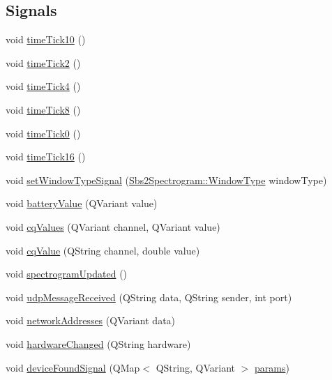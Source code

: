 \subsection*{Signals}
\begin{DoxyCompactItemize}
\item 
void \hyperlink{classSbs2Callback_a5184124613eada5520f1a3a170004a2b}{time\-Tick10} ()
\item 
void \hyperlink{classSbs2Callback_ad2664cc07b84a0bf32853d8b73a33269}{time\-Tick2} ()
\item 
void \hyperlink{classSbs2Callback_afc2ede902add0f774b75fd6180c4d2f6}{time\-Tick4} ()
\item 
void \hyperlink{classSbs2Callback_a97bab20747140c597618f804b6228072}{time\-Tick8} ()
\item 
void \hyperlink{classSbs2Callback_a61ec73d9af8b810f81eda4d953a7d514}{time\-Tick0} ()
\item 
void \hyperlink{classSbs2Callback_aadf4b16079f8dcadbd09b3469682092f}{time\-Tick16} ()
\item 
void \hyperlink{classSbs2Callback_ad3bb5730a00149ba4b72342050aaf0a6}{set\-Window\-Type\-Signal} (\hyperlink{classSbs2Spectrogram_a22265347883488b8385c83b67882d915}{Sbs2\-Spectrogram\-::\-Window\-Type} window\-Type)
\item 
void \hyperlink{classSbs2Callback_ab6e4c13c9062855f656df9ceed5cd043}{battery\-Value} (Q\-Variant value)
\item 
void \hyperlink{classSbs2Callback_a06f6ee83c0568d015737115c1bda0c35}{cq\-Values} (Q\-Variant channel, Q\-Variant value)
\item 
void \hyperlink{classSbs2Callback_a234ed679eb92e8d74a570fe6b212ac01}{cq\-Value} (Q\-String channel, double value)
\item 
void \hyperlink{classSbs2Callback_aad050bf9599c2adce3d7a40e635da9ad}{spectrogram\-Updated} ()
\item 
void \hyperlink{classSbs2Callback_a2f0493b36e4cf02f621f0a4a5867f30e}{udp\-Message\-Received} (Q\-String data, Q\-String sender, int port)
\item 
void \hyperlink{classSbs2Callback_a3f36470fea877fef65f50f0b6c123e10}{network\-Addresses} (Q\-Variant data)
\item 
void \hyperlink{classSbs2Callback_ac03ad51c29e3ed87d6ddca27422f594a}{hardware\-Changed} (Q\-String hardware)
\item 
void \hyperlink{classSbs2Callback_af2630321eef9e48a74e3d4029513117c}{device\-Found\-Signal} (Q\-Map$<$ Q\-String, Q\-Variant $>$ \hyperlink{classSbs2Callback_acd4a65e3bee2e9a1f9ceccd9cfbd17be}{params})
\end{DoxyCompactItemize}
